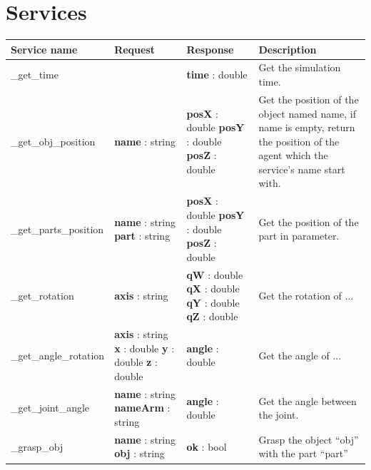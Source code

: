 \documentclass[notitlepage]{report}
\begin{document}
\chapter{Services}
\begin{supertabular}{|p{2.9cm}|p{2.5cm}|p{3cm}|p{5.5cm}|}
	\hline
    Service name & Request & Response & Description \\
  	\hline
  	\_get\_time &  & \textbf{time} : double & Get the simulation time.\\
  	\hline
  	\medskip
  	\_get\_obj\_position & \medskip \textbf{name} : string & 
  		\textbf{posX} : double \newline
  		\textbf{posY} : double \newline
  		\textbf{posZ} : double
  		 & Get the position of the object named name, if name is empty, return the position of the agent which the service's name start with.\\
  	\hline
  	\_get\_parts\_position & 
  		\textbf{name} : string \newline 
  		\textbf{part} : string 
  	& 
  		\textbf{posX} : double \newline
  		\textbf{posY} : double \newline
  		\textbf{posZ} : double & Get the position of the part in parameter.\\
  	\hline
  	\_get\_rotation & 
  		\textbf{axis} : string 
  	&
  		\textbf{qW} : double \newline 
  		\textbf{qX} : double \newline
  		\textbf{qY} : double \newline
  		\textbf{qZ} : double & Get the rotation of ...\\
  	\hline
  	\_get\_angle\_rotation & 
  		\textbf{axis} : string \newline
  		\textbf{x} : double \newline
  		\textbf{y} : double \newline
  		\textbf{z} : double 
    & 
		\textbf{angle} : double & Get the angle of ...\\
  	\hline
  	\_get\_joint\_angle & 
  		\textbf{name} : string \newline
  		\textbf{nameArm} : string 
  	& 
  		\textbf{angle} : double & Get the angle between the joint.\\
  	\hline
  	\_grasp\_obj & 
  		\textbf{name} : string \newline
  		\textbf{obj} : string
  	& 
  		\textbf{ok} : bool & Grasp the object ``obj'' with the part ``part''\\

\end{supertabular}
\end{document}
